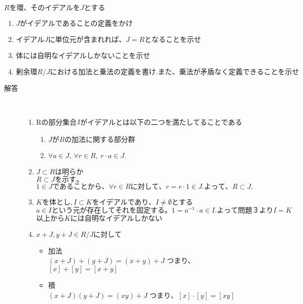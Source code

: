 \documentclass[dvipdfmx]{jsarticle}
\begin{document}
\begin{tcolorbox}[colframe=black!50,colback=white,colbacktitle=black!50,coltitle=white,fonttitle=\bfseries\sffamily,title=問題2]
$Rを環、そのイデアルをJとする$
\begin{enumerate}
  \item $Jがイデアルであることの定義をかけ$
  \item $イデアルJに単位元が含まれれば、J=Rとなることを示せ$
  \item $体には自明なイデアルしかないことを示せ$
  \item $剰余環R/Jにおける加法と乗法の定義を書け.また、乗法が矛盾なく定義できることを示せ$
\end{enumerate}
\end{tcolorbox}


\begin{description}
  \item[解答] \mbox{}\\
  \begin{enumerate}
    \item Rの部分集合Jがイデアルとは以下の二つを満たしてることである
    \begin{enumerate}
      \item $JがRの加法に関する部分群$
      \item $\forall a \in J, \ \forall r \in R,\ r \cdot a \in J.$
    \end{enumerate}

    \item $J \subset Rは明らか$ \\
    $R \subset Jを示す。$\\
    $1 \in Jであることから、\forall r \in Rに対して、r = r \cdot 1 \in J.よって、R \subset J.$

    \item $Kを体とし,I \subset Kをイデアルであり、I \neq \emptyset とする$\\
    $a \in Iという元が存在してそれを固定する。1 = a^{-1} \cdot a \in I.　よって問題３よりI = K $\\
    $以上からKには自明なイデアルしかない$

    \item $x+J,y+J \in R/Jに対して$
    \begin{itemize}
      \item 加法\\
      $(x+J) + (y+J) = (x+y) + J$
      つまり、$[x]+[y] = [x+y]$
      \item 積\\
      $(x+J)(y+J) = (xy)+J$
      $つまり、[x] \cdot [y] = [xy]$


\end{itemize}
\end{enumerate}
\end{description}
\end{document}
